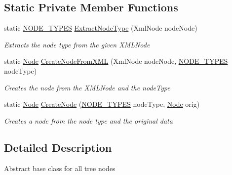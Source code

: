 \subsection*{Static Private Member Functions}
\begin{DoxyCompactItemize}
\item 
static \hyperlink{class_web_analyzer_1_1_models_1_1_settings_model_1_1_expression_tree_1_1_node_a89c72b19ff778cbc04788f4cb47a730e}{N\+O\+D\+E\+\_\+\+T\+Y\+P\+E\+S} \hyperlink{class_web_analyzer_1_1_models_1_1_settings_model_1_1_expression_tree_1_1_node_ae1efb2639fc04b709b1adbd3566a8162}{Extract\+Node\+Type} (Xml\+Node node\+Node)
\begin{DoxyCompactList}\small\item\em Extracts the node type from the given X\+M\+L\+Node \end{DoxyCompactList}\item 
static \hyperlink{class_web_analyzer_1_1_models_1_1_settings_model_1_1_expression_tree_1_1_node}{Node} \hyperlink{class_web_analyzer_1_1_models_1_1_settings_model_1_1_expression_tree_1_1_node_a1ca08dcd343feb5bf309c2702fcfa46e}{Create\+Node\+From\+X\+M\+L} (Xml\+Node node\+Node, \hyperlink{class_web_analyzer_1_1_models_1_1_settings_model_1_1_expression_tree_1_1_node_a89c72b19ff778cbc04788f4cb47a730e}{N\+O\+D\+E\+\_\+\+T\+Y\+P\+E\+S} node\+Type)
\begin{DoxyCompactList}\small\item\em Creates the node from the X\+M\+L\+Node and the node\+Type \end{DoxyCompactList}\item 
static \hyperlink{class_web_analyzer_1_1_models_1_1_settings_model_1_1_expression_tree_1_1_node}{Node} \hyperlink{class_web_analyzer_1_1_models_1_1_settings_model_1_1_expression_tree_1_1_node_a137870d8c98d82705273158fab0f4fcb}{Create\+Node} (\hyperlink{class_web_analyzer_1_1_models_1_1_settings_model_1_1_expression_tree_1_1_node_a89c72b19ff778cbc04788f4cb47a730e}{N\+O\+D\+E\+\_\+\+T\+Y\+P\+E\+S} node\+Type, \hyperlink{class_web_analyzer_1_1_models_1_1_settings_model_1_1_expression_tree_1_1_node}{Node} orig)
\begin{DoxyCompactList}\small\item\em Creates a node from the node type and the original data \end{DoxyCompactList}\end{DoxyCompactItemize}


\subsection{Detailed Description}
Abstract base class for all tree nodes 



